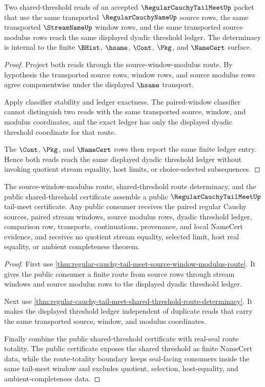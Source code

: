 \begin{theorem}
\label{thm:regular-cauchy-tail-meet-shared-threshold-route-determinacy}
Two shared-threshold reads of an accepted $\RegularCauchyTailMeetUp$ packet that use the same transported $\RegularCauchyNameUp$ source rows, the same transported $\StreamNameUp$ window rows, and the same transported source modulus rows reach the same displayed dyadic threshold ledger. The determinacy is internal to the finite $\BHist$, $\hsame$, $\Cont$, $\Pkg$, and $\NameCert$ surface.
\end{theorem}
\begin{proof}
Project both reads through the source-window-modulus route. By hypothesis the transported source rows, window rows, and source modulus rows agree componentwise under the displayed $\hsame$ transport.

Apply classifier stability and ledger exactness. The paired-window classifier cannot distinguish two reads with the same transported source, window, and modulus coordinates, and the exact ledger has only the displayed dyadic threshold coordinate for that route.

The $\Cont$, $\Pkg$, and $\NameCert$ rows then report the same finite ledger entry. Hence both reads reach the same displayed dyadic threshold ledger without invoking quotient stream equality, host limits, or choice-selected subsequences.
\end{proof}

\begin{theorem}
\label{thm:regular-cauchy-tail-meet-public-tail-meet-certificate}
The source-window-modulus route, shared-threshold route determinacy, and the public shared-threshold certificate assemble a public $\RegularCauchyTailMeetUp$ tail-meet certificate. Any public consumer receives the paired regular Cauchy sources, paired stream windows, source modulus rows, dyadic threshold ledger, comparison row, transports, continuations, provenance, and local NameCert evidence, and receives no quotient stream equality, selected limit, host real equality, or ambient completeness theorem.
\end{theorem}
\begin{proof}
First use \autoref{thm:regular-cauchy-tail-meet-source-window-modulus-route}. It gives the public consumer a finite route from source rows through stream windows and source modulus rows to the displayed dyadic threshold ledger.

Next use \autoref{thm:regular-cauchy-tail-meet-shared-threshold-route-determinacy}. It makes the displayed threshold ledger independent of duplicate reads that carry the same transported source, window, and modulus coordinates.

Finally combine the public shared-threshold certificate with real-seal route totality. The public certificate exposes the shared threshold as finite NameCert data, while the route-totality boundary keeps seal-facing consumers inside the same tail-meet window and excludes quotient, selection, host-equality, and ambient-completeness data.
\end{proof}

